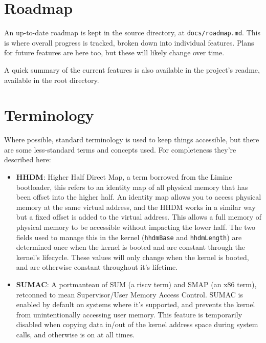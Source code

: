 \section{Roadmap}
An up-to-date roadmap is kept in the source directory, at \verb|docs/roadmap.md|. This is where overall progress is tracked, broken down into individual features. Plans for future features are here too, but these will likely change over time.

A quick summary of the current features is also available in the project's readme, available in the root directory.

\section{Terminology}
Where possible, standard terminology is used to keep things accessible, but there are some less-standard terms and concepts used. For completeness they're described here:

\begin{itemize}
    \item \textbf{HHDM}: Higher Half Direct Map, a term borrowed from the Limine bootloader, this refers to an identity map of all physical memory that has been offset into the higher half. An identity map allows you to access physical memory at the same virtual address, and the HHDM works in a similar way but a fixed offset is added to the virtual address. This allows a full memory of physical memory to be accessible without impacting the lower half. The two fields used to manage this in the kernel (\verb|hhdmBase| and \verb|hhdmLength|) are determined once when the kernel is booted and are constant through the kernel's lifecycle. These values will only change when the kernel is booted, and are otherwise constant throughout it's lifetime. 
    \item \textbf{SUMAC}: A portmanteau of SUM (a riscv term) and SMAP (an x86 term), retconned to mean Supervisor/User Memory Access Control. SUMAC is enabled by default on systems where it's supported, and prevents the kernel from unintentionally accessing user memory. This feature is temporarily disabled when copying data in/out of the kernel address space during system calls, and otherwise is on at all times.
\end{itemize}
